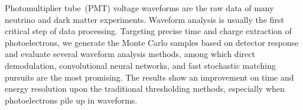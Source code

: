 Photomultiplier tube~(PMT) voltage waveforms are the raw data of many neutrino and dark matter experiments. Waveform analysis is usually the first critical step of data processing. Targeting precise time and charge extraction of photoelectrons, we generate the Monte Carlo samples based on detector response and evaluate several waveform analysis methods, among which direct demodulation, convolutional neural networks, and fast stochastic matching pursuits are the most promising. The results show an improvement on time and energy resolution upon the traditional thresholding methods, especially when photoelectrons pile up in waveforms. 